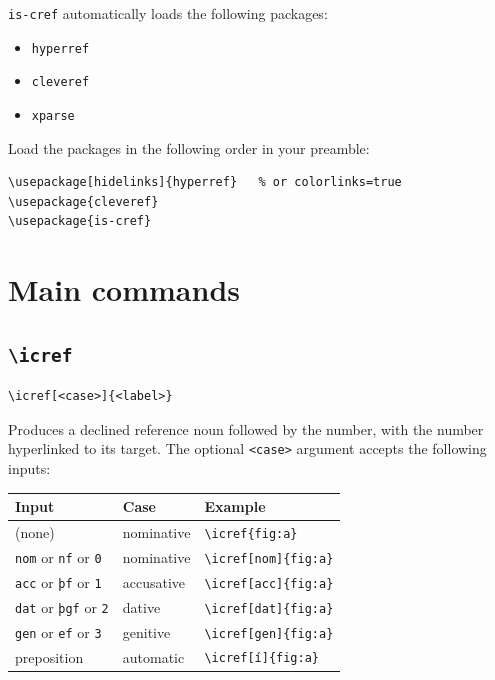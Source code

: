 \documentclass{article}
\begin{document}
\texttt{is-cref} automatically loads the following packages:

\begin{itemize}
  \item \texttt{hyperref}
  \item \texttt{cleveref}
  \item \texttt{xparse}
\end{itemize}

Load the packages in the following order in your preamble:

\begin{lstlisting}
\usepackage[hidelinks]{hyperref}   % or colorlinks=true
\usepackage{cleveref}
\usepackage{is-cref}
\end{lstlisting}

\section{Main commands}

\subsection{\texttt{\textbackslash icref}}

\begin{lstlisting}
\icref[<case>]{<label>}
\end{lstlisting}

Produces a declined reference noun followed by the number, with the
number hyperlinked to its target. The optional \texttt{<case>} argument
accepts the following inputs:

\begin{center}
\begin{tabular}{lll}
  \toprule
  Input & Case & Example \\
  \midrule
  (none)                                       & nominative & \verb|\icref{fig:a}| \\
  \texttt{nom} or \texttt{nf} or \texttt{0}  & nominative & \verb|\icref[nom]{fig:a}| \\
  \texttt{acc} or \texttt{þf} or \texttt{1}  & accusative & \verb|\icref[acc]{fig:a}| \\
  \texttt{dat} or \texttt{þgf} or \texttt{2}  & dative     & \verb|\icref[dat]{fig:a}| \\
  \texttt{gen} or \texttt{ef} or \texttt{3}  & genitive   & \verb|\icref[gen]{fig:a}| \\
  preposition                                  & automatic  & \verb|\icref[í]{fig:a}| \\
  \bottomrule
\end{tabular}
\end{center}
\end{document}

